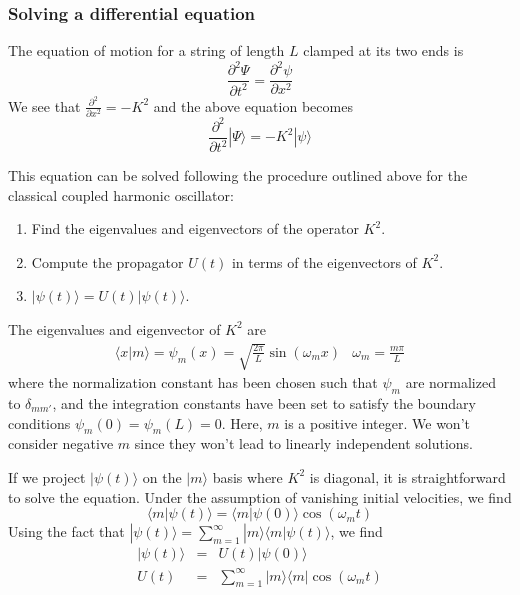 \documentclass[11pt,fleqn]{book} %
\newcommand{\bra}[1]{\langle #1|}
\newcommand{\ket}[1]{| #1\rangle}
\newcommand{\scalar}[2]{\langle #1| #2\rangle}
\begin{document}
\subsubsection*{Solving a differential equation}
The equation of motion for a string of length $L$ clamped at its two ends is
\begin{equation*}
    \frac{\partial^2\Psi}{\partial t^2}=\frac{\partial^2\psi}{\partial x^2}
\end{equation*}
We see that $\frac{\partial^2}{\partial x^2} = -K^2$ and the above equation becomes
\begin{equation*}
    \frac{\partial^2}{\partial t^2}\ket{\Psi}=-K^2\ket{\psi}
\end{equation*}


This equation can be solved following the procedure outlined above for the classical coupled harmonic oscillator:
\begin{enumerate}
    \item Find the eigenvalues and eigenvectors of the operator $K^2$.
    \item Compute the propagator $U(t)$ in terms of the eigenvectors of $K^2$.
    \item $\ket{\psi(t)}=U(t)\ket{\psi(t)}$.
\end{enumerate}

The eigenvalues and eigenvector of $K^2$ are 
\begin{equation*}
    \begin{array}{ll}
        \scalar{x}{m} = \psi_m(x) = \sqrt{\frac{2\pi}{L}}\sin\left(\omega_m x\right) & \omega_m=\frac{m\pi}{L}
    \end{array}
\end{equation*}
where the normalization constant has been chosen such that $\psi_m$ are normalized to $\delta_{mm'}$, and the integration 
constants have been set to satisfy the boundary conditions $\psi_m(0)=\psi_m(L)=0$. Here, $m$ is a positive integer.
We won't consider negative $m$ since they won't lead to linearly independent solutions.

If we project $\ket{\psi(t)}$ on the $\ket{m}$ basis where $K^2$ is diagonal, it is straightforward to solve the equation. 
Under the assumption of vanishing initial velocities, we find
\begin{equation*}
    \scalar{m}{\psi(t)} = \scalar{m}{\psi(0)}\cos\left(\omega_m t\right)
\end{equation*}
Using the fact that $\ket{\psi(t)}=\sum_{m=1}^\infty\ket{m}\scalar{m}{\psi(t)}$, we find
\begin{eqnarray*}
    \ket{\psi(t)} &=& U(t)\ket{\psi(0)} \\
    U(t) &=& \sum_{m=1}^\infty\ket{m}\bra{m}\cos\left(\omega_m t\right)
\end{eqnarray*}
\end{document}

